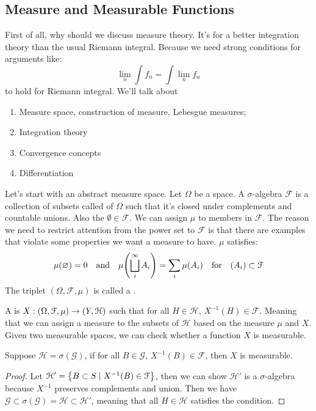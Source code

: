 \subsection{Measure and Measurable Functions}
First of all, why should we discuss measure theory. It's for a better integration theory than the usual Riemann integral. Because we need strong conditions for arguments like:
\begin{equation*}
    \lim_{n} \int f_{n} = \int \lim_{n} f_{n}
\end{equation*}
to hold for Riemann integral.  We'll talk about
\begin{enumerate}
    \item Measure space, construction of measure, Lebesgue measures;
    \item Integration theory
    \item Convergence concepts 
    \item Differentiation 
\end{enumerate}

Let's start with an abstract measure space. Let \(\Omega\) be a space. A \(\sigma\)-algebra \(\mathcal{F}\) is a collection of subsets called  of \(\Omega\) such that it's closed under complements and countable unions. Also the \(\emptyset \in \mathcal{F}\). We can assign  \(\mu\) to members in \(\mathcal{F}\). The reason we need to restrict attention from the power set to \(\mathcal{F}\) is that there are examples that violate some properties we want a measure to have. \(\mu\) satisfies:
\begin{equation*}
    \mu\pqty{\emptyset} = 0 \qq{and} \mu \pqty{\sqcup_{i}^{\infty} A_{i}} = \sum_{i} \mu(A_{i}) \qq{for} (A_{i}) \subset \mathcal{F}
\end{equation*}
The triplet \((\Omega, \mathcal{F}, \mu)\) is called a .  

A  is \(X : (\Omega, \mathcal{F}, \mu) \to \pqty{Y, \mathcal{H}}\) such that for all \(H \in \mathcal{H}\), \(X^{-1}(H) \in \mathcal{F}\). Meaning that we can assign a measure to the subsets of \(\mathcal{H}\) based on the measure \(\mu\) and \(X\). 
Given two measurable spaces, we can check whether a function \(X\) is measurable. 

\begin{lemma}
    Suppose \(\mathcal{H} = \sigma(\mathcal{G})\), if for all \(B \in \mathcal{G}\), \(X^{-1} (B) \in \mathcal{F}\), then \(X \) is measurable. 
\end{lemma}
\begin{proof}
    Let \(\mathcal{H}' = \Bqty{B\subset S\mid X^{-1}(B) \in \mathcal{F}}\), then we can show \(\mathcal{H}'\) is a \(\sigma\)-algebra because \(X^{-1}\) preserves complements and union. Then we have \(\mathcal{G} \subset \sigma(\mathcal{G}) = \mathcal{H} \subset \mathcal{H}'\), meaning that all \(H\in \mathcal{H}\) satisfies the condition.
\end{proof}

